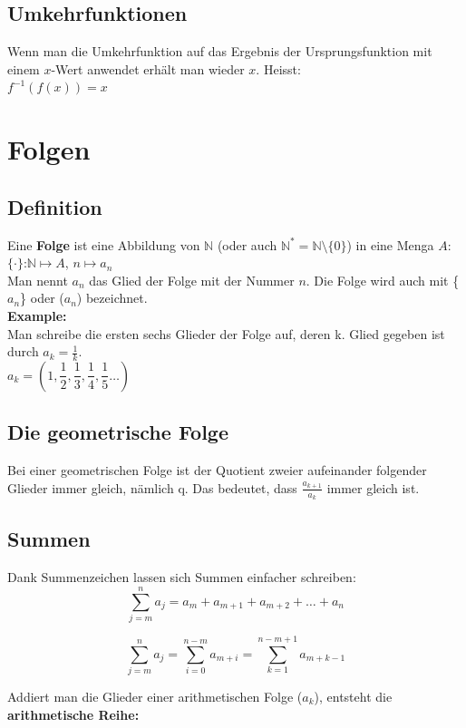 \documentclass[12pt]{scrartcl}
\begin{document}
\subsection{Umkehrfunktionen}
Wenn man die Umkehrfunktion auf das Ergebnis der Ursprungsfunktion mit einem $x$-Wert anwendet
erhält man wieder $x$. Heisst:\\
$f^{-1}(f(x)) = x$


\newpage
\section{Folgen}
\subsection{Definition}
Eine \textbf{Folge} ist eine Abbildung von $\mathbb{N}$ (oder auch $\mathbb{N}^* = \mathbb{N} \setminus \{0\}$) in eine Menga $A$:\\
$\{\cdot\}$:$\mathbb{N} \mapsto A$, $n \mapsto a_n$\\
Man nennt $a_n$ das Glied der Folge mit der Nummer $n$. Die Folge wird auch mit \{$a_n$\} oder ($a_n$) bezeichnet.\\

\textbf{Example:}\\
Man schreibe die ersten sechs Glieder der Folge auf, deren k. Glied gegeben ist durch $a_k = \frac{1}{k}$. \\

$a_k = \left(1,  \dfrac{1}{2}, \dfrac{1}{3}, \dfrac{1}{4}, \dfrac{1}{5}\dots\right)$


\subsection{Die geometrische Folge}
Bei einer geometrischen Folge ist der Quotient zweier aufeinander folgender Glieder immer
gleich, nämlich q. Das bedeutet, dass $\frac{a_{k+1}}{a_k}$ immer gleich ist.


\subsection{Summen}
Dank Summenzeichen lassen sich Summen einfacher schreiben:
\[\sum_{j=m}^{n} a_j = a_m + a_{m+1} + a_{m+2} + \dots + a_n\]

\[\sum_{j=m}^{n} a_j = \sum_{i=0}^{n-m} a_{m+i} = \sum_{k=1}^{n-m+1} a_{m+k-1}\]


Addiert man die Glieder einer arithmetischen Folge ($a_k$), entsteht die \textbf{arithmetische Reihe:}
\end{document}
